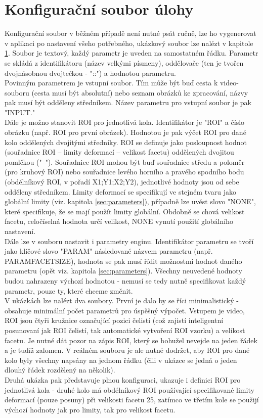 \documentclass[a4paper,12pt]{article}
\begin{document}
\section{Konfigurační soubor úlohy}
\label{sec:config}
Konfigurační soubor v běžném případě není nutné psát ručně, lze ho vygenerovat v aplikaci po nastavení všeho potřebného, ukázkový soubor lze nalézt v kapitole \ref{sec:config}. Soubor je textový, každý parametr je uveden na samostatném řádku. Parametr se skládá z identifikátoru (název velkými písmeny), oddělovače (ten je tvořen dvojnásobnou dvojtečkou - "::") a hodnotou parametru.\\
Povinným parametrem je vstupní soubor. Tím může být buď cesta k video-souboru (cesta musí být absolutní) nebo seznam obrázků ke zpracování, názvy pak musí být odděleny středníkem. Název parametru pro vstupní soubor je pak "INPUT."\\
Dále je možno stanovit ROI pro jednotlivá kola. Identifikátor je "ROI\textunderscore " a číslo obrázku (např. ROI pro první obrázek). Hodnotou je pak výčet ROI pro dané kolo oddělených dvojitými středníky. ROI se definuje jako posloupnost hodnot (souřadnice ROI -- limity deformací -- velikost facetu) oddělených dvojitou pomlčkou ("--"). Souřadnice ROI mohou být buď souřadnice středu a poloměr (pro kruhový ROI) nebo souřadnice levého horního a pravého spodního bodu (obdélníkový ROI, v pořadí X1;Y1;X2;Y2), jednotlivé hodnoty jsou od sebe odděleny středníkem. Limity deformací se specifikují ve stejném tvaru jako globální limity (viz. kapitola \ref{sec:parameters}), případně lze uvést slovo "NONE", které specifikuje, že se mají použít limity globální. Obdobně se chová velikost facetu, celočíselná hodnota určí velikost, NONE vynutí použití globálního nastavení.\\
Dále lze v souboru nastavit i parametry enginu. Identifikátor parametru se tvoří jako klíčové slovo "PARAM\textunderscore" následované názvem parametru (např. PARAM\textunderscore FACET\textunderscore SIZE), hodnota se pak musí řídit možnostmi hodnot daného parametru (opět viz. kapitola \ref{sec:parameters}). Všechny neuvedené hodnoty budou nahrazeny výchozí hodnotou - nemusí se tedy nutně specifikovat každý parametr, pouze ty, které chceme změnit.\\
V ukázkách lze nalézt dva soubory. První je dalo by se říci minimalistický - obsahuje minimální počet parametrů pro úspěšný výpočet. Vstupem je video, ROI jsou čtyři kružnice označující pozici čelistí (což zajistí inteligentní posunovaní jak ROI čelistí, tak automatické vytvoření ROI vzorku) a velikost facetu. Je nutné dát pozor na zápis ROI, který se bohužel nevejde na jeden řádek a je tudíž zalomen. V reálném souboru je ale nutné dodržet, aby ROI pro dané kolo byly všechny napsány na jednom řádku (čili v ukázce se jedná o jeden dlouhý řádek rozdělený na několik).\\
Druhá ukázka pak představuje plnou konfiguraci, ukazuje i definici ROI pro jednotlivá kola - druhé kolo má obdélníkový ROI používající specifikované limity deformací (pouze posuny) při velikosti facetu 25, zatímco ve třetím kole se použijí výchozí hodnoty jak pro limity, tak pro velikost facetu.
\newpage
\end{document}
